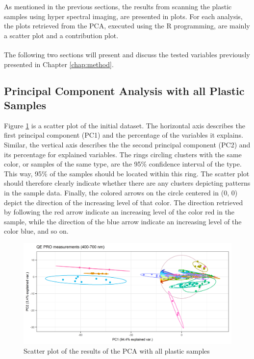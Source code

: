 As mentioned in the previous sections, the results from scanning the plastic samples using hyper spectral imaging, are presented in plots. For each analysis, the plots retrieved from the PCA, executed using the R programming, are mainly a scatter plot and a contribution plot. 
\\\\
The following two sections will present and discuss the tested variables previously presented in Chapter \ref{chap:method}. 

\subsection{Principal Component Analysis with all Plastic Samples}\label{sec:pcafull}
Figure \ref{fig:PCA_plastics_only_full_scat} is a scatter plot of the initial dataset. The horizontal axis describes the first principal component (PC1) and the percentage of the variables it explains. Similar, the vertical axis describes the the second principal component (PC2) and its percentage for explained variables. The rings circling clusters with the same color, or samples of the same type, are the 95\% confidence interval of the type. This way, 95\% of the samples should be located within this ring. The scatter plot should therefore clearly indicate whether there are any clusters depicting patterns in the sample data. Finally, the colored arrows on the circle centered in (0, 0) depict the direction of the increasing level of that color. The direction retrieved by following the red arrow indicate an increasing level of the color red in the sample, while the direction of the blue arrow indicate an increasing level of the color blue, and so on.

\begin{figure}[H]
    \centering
    \includegraphics[width=1\textwidth]{Images/results/PCA_plastics_full_only_scat.png}
    \caption{Scatter plot of the results of the PCA with all plastic samples}
    \label{fig:PCA_plastics_only_full_scat}
\end{figure}


